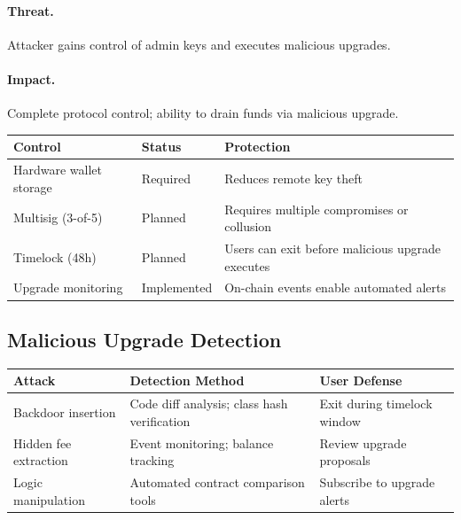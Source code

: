 \paragraph{Threat.} Attacker gains control of admin keys and executes malicious upgrades.

\paragraph{Impact.} Complete protocol control; ability to drain funds via malicious upgrade.

\begin{center}
\begin{tabularx}{\textwidth}{l l >{\raggedright\arraybackslash}X}
\toprule
\textbf{Control} & \textbf{Status} & \textbf{Protection} \\
\midrule
Hardware wallet storage & Required & Reduces remote key theft \\
Multisig (3-of-5) & Planned & Requires multiple compromises or collusion \\
Timelock (48h) & Planned & Users can exit before malicious upgrade executes \\
Upgrade monitoring & Implemented & On-chain events enable automated alerts \\
\bottomrule
\end{tabularx}
\end{center}

\subsection{Malicious Upgrade Detection}

\begin{center}
\begin{tabularx}{\textwidth}{l >{\raggedright\arraybackslash}X >{\raggedright\arraybackslash}X}
\toprule
\textbf{Attack} & \textbf{Detection Method} & \textbf{User Defense} \\
\midrule
Backdoor insertion & Code diff analysis; class hash verification & Exit during timelock window \\
Hidden fee extraction & Event monitoring; balance tracking & Review upgrade proposals \\
Logic manipulation & Automated contract comparison tools & Subscribe to upgrade alerts \\
\bottomrule
\end{tabularx}
\end{center}

